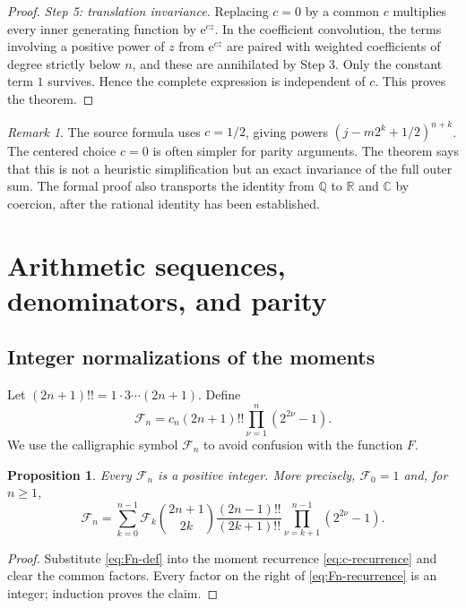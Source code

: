 \documentclass[11pt]{article}
\numberwithin{equation}{section}
\newtheorem{proposition}[theorem]{Proposition}
\theoremstyle{definition}
\theoremstyle{remark}
\newtheorem{remark}[theorem]{Remark}
\newcommand{\R}{\mathbb{R}}
\newcommand{\C}{\mathbb{C}}
\newcommand{\Q}{\mathbb{Q}}
\newcommand{\e}{\mathrm{e}}
\begin{document}
\begin{proof}
\emph{Step 5: translation invariance.}
Replacing $c=0$ by a common $c$ multiplies every inner generating function by
$\e^{cz}$.  In the coefficient convolution, the terms involving a positive
power of $z$ from $\e^{cz}$ are paired with weighted coefficients of degree
strictly below $n$, and these are annihilated by Step 3.  Only the constant
term $1$ survives.  Hence the complete expression is independent of $c$.
This proves the theorem.
\end{proof}

\begin{remark}
The source formula uses $c=1/2$, giving powers
$(j-m2^k+1/2)^{n+k}$.  The centered choice $c=0$ is often simpler for parity
arguments.  The theorem says that this is not a heuristic simplification but
an exact invariance of the full outer sum.  The formal proof also transports
the identity from $\Q$ to $\R$ and $\C$ by coercion, after the rational
identity has been established.
\end{remark}

\section{Arithmetic sequences, denominators, and parity}
\label{sec:arithmetic}

\subsection{Integer normalizations of the moments}

Let $(2n+1)!!=1\cdot3\cdots(2n+1)$.  Define
\begin{equation}\label{eq:Fn-def}
 \mathcal F_n
 =c_n(2n+1)!!\prod_{\nu=1}^{n}(2^{2\nu}-1).
\end{equation}
We use the calligraphic symbol $\mathcal F_n$ to avoid confusion with the
function $F$.

\begin{proposition}\label{prop:Fn-integer}
Every $\mathcal F_n$ is a positive integer.  More precisely,
$\mathcal F_0=1$ and, for $n\ge1$,
\begin{equation}\label{eq:Fn-recurrence}
 \mathcal F_n=
 \sum_{k=0}^{n-1}\mathcal F_k\binom{2n+1}{2k}
 \frac{(2n-1)!!}{(2k+1)!!}
 \prod_{\nu=k+1}^{n-1}(2^{2\nu}-1).
\end{equation}
\end{proposition}

\begin{proof}
Substitute \eqref{eq:Fn-def} into the moment recurrence
\eqref{eq:c-recurrence} and clear the common factors.  Every factor on the
right of \eqref{eq:Fn-recurrence} is an integer; induction proves the claim.
\end{proof}
\end{document}
